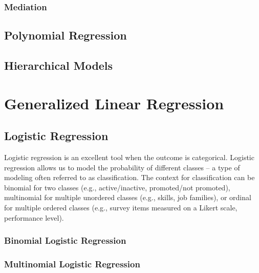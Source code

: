 \documentclass[]{book}
\begin{document}
\hypertarget{mediation}{%
\subsection{Mediation}\label{mediation}}

\hypertarget{polynomial-regression}{%
\section{Polynomial Regression}\label{polynomial-regression}}

\hypertarget{hierarchical-models}{%
\section{Hierarchical Models}\label{hierarchical-models}}

\hypertarget{glm}{%
\chapter{Generalized Linear Regression}\label{glm}}

\hypertarget{logistic-regression}{%
\section{Logistic Regression}\label{logistic-regression}}

Logistic regression is an excellent tool when the outcome is categorical. Logistic regression allows us to model the probability of different classes -- a type of modeling often referred to as classification. The context for classification can be binomial for two classes (e.g., active/inactive, promoted/not promoted), multinomial for multiple unordered classes (e.g., skills, job families), or ordinal for multiple ordered classes (e.g., survey items measured on a Likert scale, performance level).

\hypertarget{binomial-logistic-regression}{%
\subsection{Binomial Logistic Regression}\label{binomial-logistic-regression}}

\hypertarget{multinomial-logistic-regression}{%
\subsection{Multinomial Logistic Regression}\label{multinomial-logistic-regression}}
\end{document}
